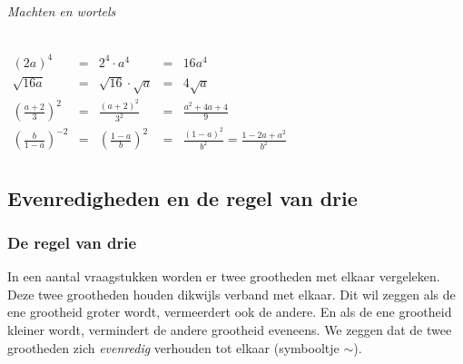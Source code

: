 	\emph{Machten en wortels}
	
\begin{voorbeeld}
	\ \\
		\begin{math}
	\begin{array}{ccccc}
	(2a)^{4} & = & 2^{4}\cdot a^{4} &=& 16a^{4} \\
	\sqrt{16a} & = & \sqrt{16}\cdot\sqrt{a}&=&4\sqrt{a} \\
	\left(\frac{a+2}{3}\right)^{2} & = &  \frac{(a+2)^{2}}{3^{2}}&=&\frac{a^{2}+4a+4}{9} \\
	\left(\frac{b}{1-a}\right)^{-2} & = &  \left(\frac{1-a}{b}\right)^{2}&=&\frac{(1-a)^{2}}{b^{2}}=\frac{1-2a+a^{2}}{b^{2}} \\
	\end{array}
	\end{math}
\end{voorbeeld}

\subsection{Evenredigheden en de regel van drie}

\subsubsection{De regel van drie}

In een aantal vraagstukken worden er twee grootheden met elkaar vergeleken.
Deze twee grootheden houden dikwijls verband met elkaar. Dit wil zeggen
als de ene grootheid groter wordt, vermeerdert ook de andere. En als
de ene grootheid kleiner wordt, vermindert de andere grootheid eveneens.
We zeggen dat de twee grootheden zich \emph{evenredig} verhouden tot
elkaar (symbooltje $\sim$).



